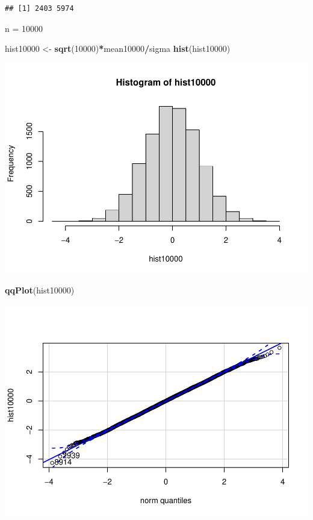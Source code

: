 \documentclass[
]{article}
\newenvironment{Shaded}{\begin{snugshade}}{\end{snugshade}}
\newcommand{\DecValTok}[1]{\textcolor[rgb]{0.00,0.00,0.81}{#1}}
\newcommand{\KeywordTok}[1]{\textcolor[rgb]{0.13,0.29,0.53}{\textbf{#1}}}
\newcommand{\NormalTok}[1]{#1}
\newcommand{\OperatorTok}[1]{\textcolor[rgb]{0.81,0.36,0.00}{\textbf{#1}}}
\newcommand{\StringTok}[1]{\textcolor[rgb]{0.31,0.60,0.02}{#1}}
\begin{document}
\begin{verbatim}
## [1] 2403 5974
\end{verbatim}

n = 10000

\begin{Shaded}
\begin{Highlighting}[]
\NormalTok{hist10000 <-}\StringTok{ }\KeywordTok{sqrt}\NormalTok{(}\DecValTok{10000}\NormalTok{)}\OperatorTok{*}\NormalTok{mean10000}\OperatorTok{/}\NormalTok{sigma}
\KeywordTok{hist}\NormalTok{(hist10000)}
\end{Highlighting}
\end{Shaded}

\includegraphics{stad80a1_files/figure-latex/unnamed-chunk-13-1.pdf}

\begin{Shaded}
\begin{Highlighting}[]
\KeywordTok{qqPlot}\NormalTok{(hist10000)}
\end{Highlighting}
\end{Shaded}

\includegraphics{stad80a1_files/figure-latex/unnamed-chunk-13-2.pdf}
\end{document}
